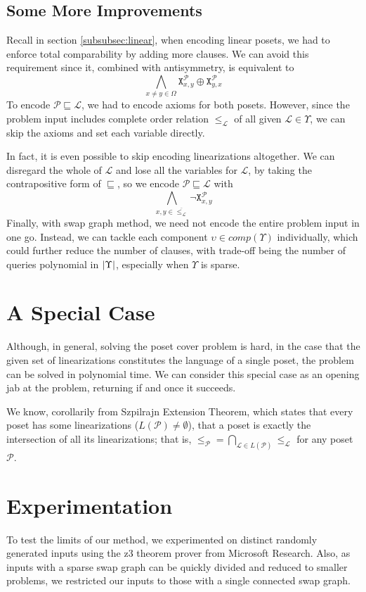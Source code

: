 \documentclass[12pt]{llncs}
\DeclarePairedDelimiter{\abs}{\lvert}{\rvert}
\let\oldleq\leq
\renewcommand{\leq}[1][]{\oldleq_{#1}}
\newcommand{\poset}[1]{\mathcal{#1}}
\newcommand{\uni}[1][]{\Omega_{#1}}
\newcommand{\lang}[1]{L(#1)}
\newcommand{\lext}{\sqsubseteq}
\newcommand{\complmt}[1]{\overline{#1}}
\newcommand{\satvar}[2]{\mathtt{X}_{#1}^{#2}}
\begin{document}
\subsection{Some More Improvements}
Recall in section \ref{subsubsec:linear}, when encoding linear posets, we had to enforce total comparability by adding more clauses. We can avoid this requirement since it, combined with antisymmetry, is equivalent to
\[
\bigwedge_{x \neq y \in \uni} \satvar{x,y}{\poset{P}} \oplus \satvar{y,x}{\poset{P}}
\]
To encode $\poset{P} \lext \poset{L}$, we had to encode axioms for both posets. However, since the problem input includes complete order relation $\leq[\poset{L}]$ of all given $\poset{L} \!\in\! \Upsilon$, we can skip the axioms and set each variable directly.

In fact, it is even possible to skip encoding linearizations altogether. We can disregard the whole of $\poset{L}$ and lose all the variables for $\poset{L}$, by taking the contrapositive form of $\lext$, so we encode $\poset{P} \lext \poset{L}$ with
\[
\bigwedge_{x,y \in \complmt{\leq[\poset{L}]}} \neg \satvar{x,y}{\poset{P}}
\]
Finally, with swap graph method, we need not encode the entire problem input in one go. Instead, we can tackle each component $\upsilon \!\in\! comp(\Upsilon)$ individually, which could further reduce the number of clauses, with trade-off being the number of queries polynomial in $\abs{\Upsilon}$, especially when $\Upsilon$ is sparse.

\section{A Special Case}
Although, in general, solving the poset cover problem is hard, in the case that the given set of linearizations constitutes the language of a single poset, the problem can be solved in polynomial time. We can consider this special case as an opening jab at the problem, returning if and once it succeeds.

We know, corollarily from Szpilrajn Extension Theorem, which states that every poset has some linearizations ($\lang{\poset{P}} \neq \emptyset$), that a poset is exactly the intersection of all its linearizations; that is, $\leq[\poset{P}] = \bigcap_{\poset{L} \in \lang{\poset{P}}} \leq[\poset{L}]$ for any poset $\poset{P}$.

\section{Experimentation}
To test the limits of our method, we experimented on distinct randomly generated inputs using the z3 theorem prover from Microsoft Research. Also, as inputs with a sparse swap graph can be quickly divided and reduced to smaller problems, we restricted our inputs to those with a single connected swap graph.
\end{document}
